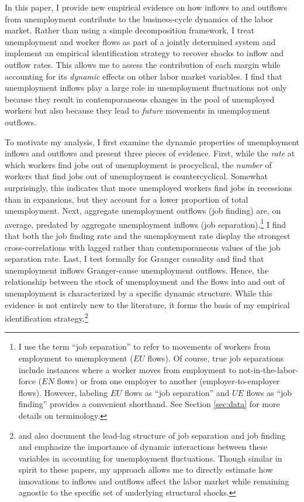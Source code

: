 \documentclass[12pt]{article}
\begin{document}
In this paper, I provide new empirical evidence on how inflows to and outflows from unemployment contribute to the business-cycle dynamics of the labor market. Rather than using a simple decomposition framework, I treat unemployment and worker flows as part of a jointly determined system and implement an empirical identification strategy to recover shocks to inflow and outflow rates. This allows me to assess the contribution of each margin while accounting for its \textit{dynamic} effects on other labor market variables. I find that unemployment inflows play a large role in unemployment fluctuations not only because they result in contemporaneous changes in the pool of unemployed workers but also because they lead to \textit{future} movements in unemployment outflows.

To motivate my analysis, I first examine the dynamic properties of unemployment inflows and outflows and present three pieces of evidence. First, while the \textit{rate} at which workers find jobs out of unemployment is procyclical, the \textit{number} of workers that find jobs out of unemployment is countercyclical. Somewhat surprisingly, this indicates that more unemployed workers find jobs in recessions than in expansions, but they account for a lower proportion of total unemployment. Next, aggregate unemployment outflows (job finding) are, on average, predated by aggregate unemployment inflows (job separation).\footnote{I use the term ``job separation'' to refer to movements of workers from employment to unemployment ($EU$ flows). Of course, true job separations include instances where a worker moves from employment to not-in-the-labor-force ($EN$ flows) or from one employer to another (employer-to-employer flows). However, labeling $EU$ flows as ``job separation'' and $UE$ flows as ``job finding'' provides a convenient shorthand. See Section \ref{sec:data} for more details on terminology.} I find that both the job finding rate and the unemployment rate display the strongest cross-correlations with lagged rather than contemporaneous values of the job separation rate. Last, I test formally for Granger causality and find that unemployment inflows Granger-cause unemployment outflows. Hence, the relationship between the stock of unemployment and the flows into and out of unemployment is characterized by a specific dynamic structure. While this evidence is not entirely new to the literature, it forms the basis of my empirical identification strategy.\footnote{\cite{Fujita:2009aa} and \cite{Barnichon:2012aa} also document the lead-lag structure of job separation and job finding and emphasize the importance of dynamic interactions between these variables in accounting for unemployment fluctuations. Though similar in spirit to these papers, my approach allows me to directly estimate how innovations to inflows and outflows affect the labor market while remaining agnostic to the specific set of underlying structural shocks.}
\end{document}
